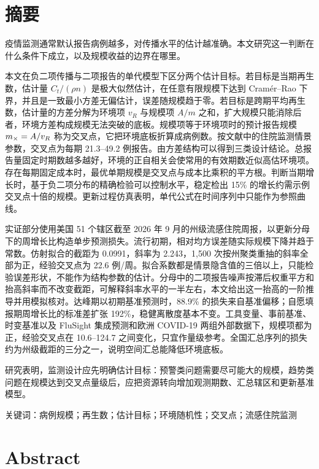 \chapter*{摘要}

疫情监测通常默认报告病例越多，对传播水平的估计越准确。本文研究这一判断在什么条件下成立，以及规模收益的边界在哪里。

本文在负二项传播与二项报告的单代模型下区分两个估计目标。若目标是当期再生数，估计量 $C_t/(\rho n)$ 是极大似然估计，在任意有限规模下达到 Cram\'er--Rao 下界，并且是一致最小方差无偏估计，误差随规模趋于零。若目标是跨期平均再生数，估计量的方差分解为环境项 $v_R$ 与规模项 $A/m$ 之和，扩大规模只能消除后者，环境方差构成规模无法突破的底板。规模项等于环境项时的预计报告规模 $m_{\times}=A/v_R$ 称为交叉点，它把环境底板折算成病例数。按文献中的住院监测情景参数，交叉点为每期 21.3--49.2 例报告。由方差结构可以得到三类设计结论。总报告量固定时期数越多越好，环境的正自相关会使常用的有效期数近似高估环境项。存在每期固定成本时，最优单期规模是交叉点与成本比乘积的平方根。判断当期增长时，基于负二项分布的精确检验可以控制水平，稳定检出 15\% 的增长约需示例交叉点十倍的规模。更新过程仿真表明，单代公式在时间序列中只能作为参照曲线。

实证部分使用美国 51 个辖区截至 2026 年 9 月的州级流感住院周报，以更新分母下的周增长比构造单步预测损失。流行初期，相对均方误差随实际规模下降并趋于常数。仿射拟合的截距为 0.0991，斜率为 2.243，1,500 次按州聚类重抽的斜率全部为正，经验交叉点为 22.6 例/周。拟合系数都是情景隐含值的三倍以上，只能检验误差形状，不能作为结构参数的估计。分母中的二项报告噪声按滞后权重平方和抬高斜率而不改变截距，可解释斜率水平的一半左右，本文给出这一抬高的一阶推导并用模拟核对。达峰期以初期基准预测时，88.9\% 的损失来自基准偏移；自愿填报期周增长比的标准差扩张 192\%，稳健离散度基本不变。工具变量、事前基准、时变基准以及 FluSight 集成预测和欧洲 COVID-19 两组外部数据下，规模项都为正，经验交叉点在 10.6--124.7 之间变化，只宜作量级参考。全国汇总序列的损失约为州级截距的三分之一，说明空间汇总能降低环境底板。

研究表明，监测设计应先明确估计目标：预警类问题需要尽可能大的规模，趋势类问题在规模达到交叉点量级后，应把资源转向增加观测期数、汇总辖区和更新基准模型。

\vspace{1em}
\noindent\heiti 关键词：\normalfont 病例规模；再生数；估计目标；环境随机性；交叉点；流感住院监测

\chapter*{Abstract}


